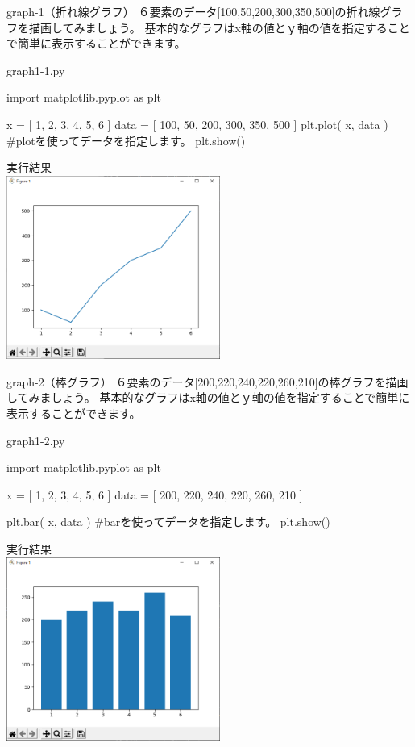 \newpage
\begin{pabox}{graph-1（折れ線グラフ）}
６要素のデータ[100,50,200,300,350,500]の折れ線グラフを描画してみましょう。
基本的なグラフはx軸の値とｙ軸の値を指定することで簡単に表示することができます。
\begin{legbox}{graph1-1.py}
\begin{listing}{1}
import matplotlib.pyplot as plt

x = [ 1, 2, 3, 4, 5, 6 ]
data = [ 100, 50, 200, 300, 350, 500 ]
plt.plot( x, data )
#plotを使ってデータを指定します。
plt.show()
\end{listing}


実行結果\\

\includegraphics[width=7cm]{images/graph1.png} 

\end{legbox}
\end{pabox}
\newpage

\begin{pabox}{graph-2（棒グラフ）}
６要素のデータ[200,220,240,220,260,210]の棒グラフを描画してみましょう。
基本的なグラフはx軸の値とｙ軸の値を指定することで簡単に表示することができます。
\begin{legbox}{graph1-2.py}
\begin{listing}{1}
import matplotlib.pyplot as plt

x = [ 1, 2, 3, 4, 5, 6 ]
data = [ 200, 220, 240, 220, 260, 210 ]

plt.bar( x, data )
#barを使ってデータを指定します。
plt.show()
\end{listing}


実行結果\\

\includegraphics[width=7cm]{images/graph2.png} 

\end{legbox}
\end{pabox}

